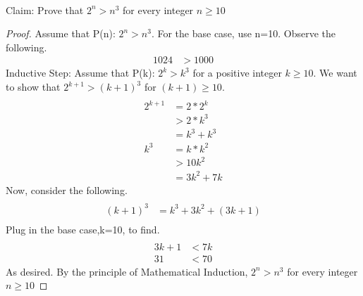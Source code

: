 \documentclass[12pt]{article}
\newenvironment{problem}[2][Problem]{\begin{trivlist}
\item[\hskip \labelsep {\bfseries #1}\hskip \labelsep {\bfseries #2.}]}{\end{trivlist}}
\begin{document}
\begin{problem}{3}
\text{ }\\
 Claim: Prove that $2^n > n^3$ for every integer $n\geq10$
\end{problem}
\begin{proof}
Assume that P(n): $2^n > n^3$. For the base case, use n=10. Observe the following. 
\begin{align}
\nonumber
1024&>1000
\end{align}
Inductive Step: Assume that P(k): $2^k > k^3$ for a positive integer $k\geq10$. We want to show that  $2^{k+1} > (k+1)^3$ for $(k+1)\geq10$.
\begin{align}
\\ \nonumber
2^{k+1}&=2 * 2^{k}
\\ \nonumber
&>2*k^3
\\ \nonumber 
&= k^3+k^3
\\ \nonumber 
k^3&=k * k^2 
\\ \nonumber
&>10k^{2}
\\ \nonumber
&= 3k^2+7k
\end{align}
Now, consider the following.
\begin{align}
\\ \nonumber
(k+1)^3&=k^3+3k^2+(3k+1)
\\ \nonumber
\end{align}
Plug in the base case,k=10, to find. 
\begin{align}
\\ \nonumber
3k+1 &< 7k
\\ \nonumber
31 &< 70
\end{align}
As desired. By the principle of Mathematical Induction, $2^n > n^3$ for every integer $n\geq10$
\end{proof} 
\end{document}
